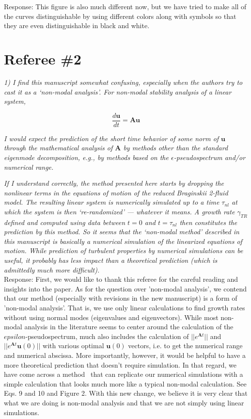\documentclass[12pt]{article}
\def\beq{\begin{equation}}
\def\eeq{\end{equation}}
\newcommand{\diff}[2]{\frac{d#1}{d#2}}
\begin{document}
Response: This figure is also much different now, but we have tried to make all of the curves distinguishable by using different colors along with symbols so that they are even distinguishable in black and white.


\section{Referee \#2}

\emph{1) I find this manuscript somewhat confusing, especially when the authors try to cast it as a ‘non-modal analysis’. For non-modal stability analysis of a linear system,}

\beq
\diff{\mathbf{u}}{t} = \mathbf{A u} \nonumber
\eeq

\emph{I would expect the prediction of the short time behavior of some norm of $\mathbf{u}$ through the mathematical analysis of $\mathbf{A}$
by methods other than the standard eigenmode decomposition, e.g., by methods based on the $\epsilon$-pseudospectrum and/or numerical range.}

\emph{If I understand correctly, the method presented here starts by dropping the nonlinear terms in
the equations of motion of the reduced Braginskii 2-fluid model. The resulting linear system is
numerically simulated up to a time $\tau_{nl}$ at which the system is then ‘re-randomized’ — whatever
it means. A growth rate $\gamma_{TR}$ defined and computed using data between $t = 0$ and $t = \tau_{nl}$ then
constitutes the prediction by this method. So it seems that the ‘non-modal method’ described in
this manuscript is basically a numerical simulation of the linearized equations of motion. While
prediction of turbulent properties by numerical simulations can be useful, it probably has less
impact than a theoretical prediction (which is admittedly much more difficult).} \\

Response: First, we would like to thank this referee for the careful reading and insights into the paper. As for the question over 'non-modal analysis', 
we contend that our method (especially with revisions in the new manuscript) is a form of 'non-modal analysis'. That is, we use only linear calculations to find growth rates without using normal modes (eigenvalues and eigenvectors). While most non-modal analysis in the literature seems to center around the calculation of the $epsilon$-pseudospectrum, much also includes the calculation of $||e^{\mathbf{A} t}||$ and $||e^{\mathbf{A} t} \mathbf{u}(0)||$ with various optimal $\mathbf{u}(0)$ vectors, i.e. to get the numerical range and numerical abscissa. More importantly, however, it would be helpful to have a more theoretical prediction that doesn't require simulation. In that regard, we have come across a method~\cite{camargo1998} that can replicate our numerical simulations with a simple calculation that looks much more like a typical non-modal calculation. See Eqs. 9 and 10 and Figure 2. With this new change, we believe it is very clear that what we are doing is non-modal analysis and that we are not simply using linear simulations. \\
\end{document}
